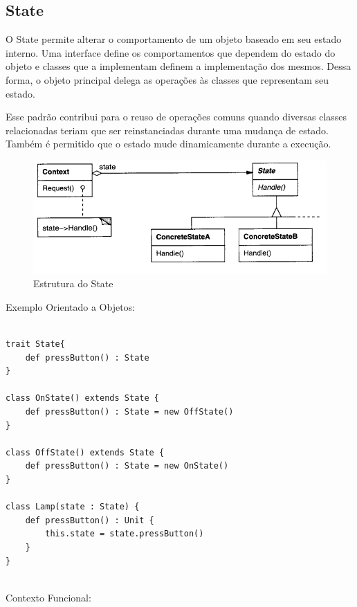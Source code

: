 \subsection{State}

O State permite alterar o comportamento de um objeto baseado 
em seu estado interno. Uma interface define os comportamentos 
que dependem do estado do objeto e classes que a implementam 
definem a implementação dos mesmos. Dessa forma, o objeto 
principal delega as operações às classes que representam 
seu estado.

Esse padrão contribui para o reuso de operações comuns quando 
diversas classes relacionadas teriam que ser reinstanciadas 
durante uma mudança de estado. Também é permitido que o 
estado mude dinamicamente durante a execução.

\begin{figure}[htb]
	\caption{\label{fig_grafico}Estrutura do State}
	\begin{center}
	    \includegraphics[scale=0.5]{5_padroes-contexto-funcional/5.3_comportamentais/5.3.08_state/diagram.png}
	\end{center}
\end{figure}

Exemplo Orientado a Objetos:

\begin{lstlisting}[caption={State Orientação a Objetos},label=oostate]

trait State{
    def pressButton() : State
}

class OnState() extends State {
    def pressButton() : State = new OffState()
}

class OffState() extends State {
    def pressButton() : State = new OnState()
}

class Lamp(state : State) {
    def pressButton() : Unit {
        this.state = state.pressButton()
    }
}
    
\end{lstlisting}

Contexto Funcional:

